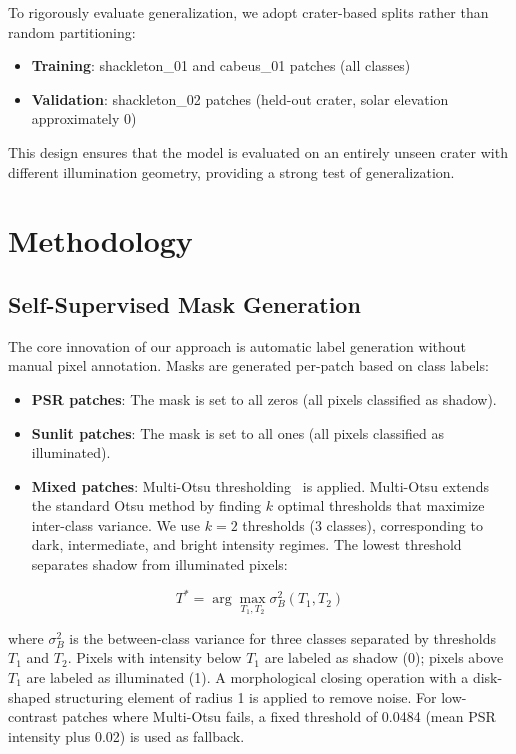 \documentclass[journal]{IEEEtran}
\begin{document}
To rigorously evaluate generalization, we adopt crater-based splits rather than random partitioning:
\begin{itemize}
    \item \textbf{Training}: shackleton\_01 and cabeus\_01 patches (all classes)
    \item \textbf{Validation}: shackleton\_02 patches (held-out crater, solar elevation approximately 0\textdegree)
\end{itemize}

This design ensures that the model is evaluated on an entirely unseen crater with different illumination geometry, providing a strong test of generalization.

\section{Methodology}
\label{sec:method}

\subsection{Self-Supervised Mask Generation}

The core innovation of our approach is automatic label generation without manual pixel annotation. Masks are generated per-patch based on class labels:

\begin{itemize}
    \item \textbf{PSR patches}: The mask is set to all zeros (all pixels classified as shadow).
    \item \textbf{Sunlit patches}: The mask is set to all ones (all pixels classified as illuminated).
    \item \textbf{Mixed patches}: Multi-Otsu thresholding~\cite{Otsu1979_Threshold} is applied. Multi-Otsu extends the standard Otsu method by finding $k$ optimal thresholds that maximize inter-class variance. We use $k=2$ thresholds (3 classes), corresponding to dark, intermediate, and bright intensity regimes. The lowest threshold separates shadow from illuminated pixels:
\end{itemize}

\begin{equation}
T^* = \arg\max_{T_1, T_2} \sigma_B^2(T_1, T_2)
\label{eq:multilotsu}
\end{equation}

where $\sigma_B^2$ is the between-class variance for three classes separated by thresholds $T_1$ and $T_2$. Pixels with intensity below $T_1$ are labeled as shadow (0); pixels above $T_1$ are labeled as illuminated (1). A morphological closing operation with a disk-shaped structuring element of radius 1 is applied to remove noise. For low-contrast patches where Multi-Otsu fails, a fixed threshold of 0.0484 (mean PSR intensity plus 0.02) is used as fallback.
\end{document}
